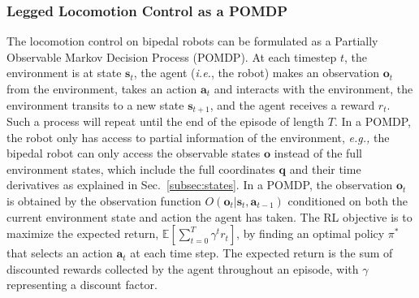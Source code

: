 \subsubsection{Legged Locomotion Control as a POMDP}
The locomotion control on bipedal robots can be formulated as a Partially Observable Markov Decision Process (POMDP). 
At each timestep $t$, the environment is at state $\mathbf{s}_t$, the agent (\textit{i.e.}, the robot) makes an observation $\mathbf{o}_t$ from the environment, takes an action $\mathbf{a}_{t}$ and interacts with the environment, the environment transits to a new state $\mathbf{s}_{t+1}$, and the agent receives a reward $r_t$.  
Such a process will repeat until the end of the episode of length $T$. 
In a POMDP, the robot only has access to partial information of the environment, \textit{e.g.,} the bipedal robot can only access the observable states $\mathbf{o}$ instead of the full environment states, which include the full coordinates $\mathbf{q}$ and their time derivatives as explained in Sec.~\ref{subsec:states}.
In a POMDP, the observation $\mathbf{o}_t$ is obtained by the observation function $O(\mathbf{o}_{t} | \mathbf{s}_{t}, \mathbf{a}_{t-1})$ conditioned on both the current environment state and action the agent has taken.
The RL objective is to maximize the expected return, $\mathbb{E}[\sum^T_{t=0} \gamma^t r_t]$, by finding an optimal policy $\pi^*$ that selects an action $\mathbf{a}_t$ at each time step.
The expected return is the sum of discounted rewards collected by the agent throughout an episode, with $\gamma$ representing a discount factor.


